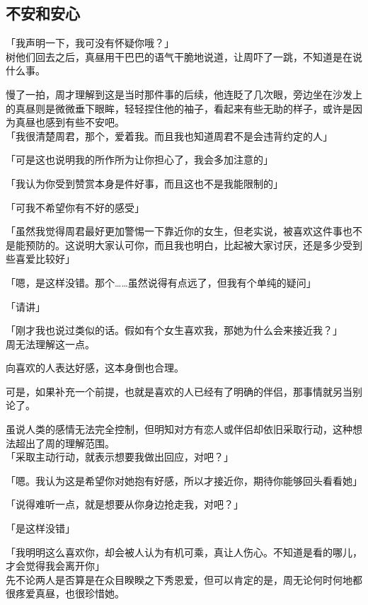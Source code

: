 \subsection{不安和安心}

「我声明一下，我可没有怀疑你哦？」\\

树他们回去之后，真昼用干巴巴的语气干脆地说道，让周吓了一跳，不知道是在说什么事。

慢了一拍，周才理解到这是当时那件事的后续，他连眨了几次眼，旁边坐在沙发上的真昼则是微微垂下眼眸，轻轻捏住他的袖子，看起来有些无助的样子，或许是因为真昼也感到有些不安吧。\\

「我很清楚周君，那个，爱着我。而且我也知道周君不是会违背约定的人」

「可是这也说明我的所作所为让你担心了，我会多加注意的」

「我认为你受到赞赏本身是件好事，而且这也不是我能限制的」

「可我不希望你有不好的感受」

「虽然我觉得周君最好更加警惕一下靠近你的女生，但老实说，被喜欢这件事也不是能预防的。这说明大家认可你，而且我也明白，比起被大家讨厌，还是多少受到些喜爱比较好」

「嗯，是这样没错。那个……虽然说得有点远了，但我有个单纯的疑问」

「请讲」

「刚才我也说过类似的话。假如有个女生喜欢我，那她为什么会来接近我？」\\

周无法理解这一点。

向喜欢的人表达好感，这本身倒也合理。

可是，如果补充一个前提，也就是喜欢的人已经有了明确的伴侣，那事情就另当别论了。

虽说人类的感情无法完全控制，但明知对方有恋人或伴侣却依旧采取行动，这种想法超出了周的理解范围。\\

「采取主动行动，就表示想要我做出回应，对吧？」

「嗯。我认为这是希望你对她抱有好感，所以才接近你，期待你能够回头看看她」

「说得难听一点，就是想要从你身边抢走我，对吧？」

「是这样没错」

「我明明这么喜欢你，却会被人认为有机可乘，真让人伤心。不知道是看的哪儿，才会觉得我会离开你」\\

先不论两人是否算是在众目睽睽之下秀恩爱，但可以肯定的是，周无论何时何地都很疼爱真昼，也很珍惜她。\\

